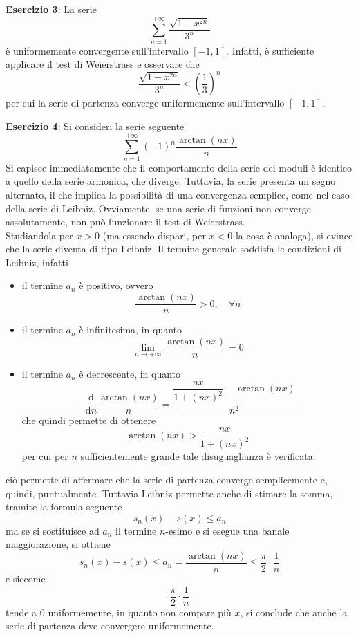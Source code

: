 \documentclass[a4paper]{extarticle}
\newcommand*\dif{\mathop{}\!\mathrm{d}}
\begin{document}
\vspace{1em}
\noindent
\textbf{Esercizio 3}: La serie
\[\sum_{n=1}^{+\infty} \frac{\sqrt{1-x^{2n}}}{3^n}\]
è uniformemente convergente sull'intervallo $[-1,1]$. Infatti, è sufficiente applicare il test di Weierstrass e osservare che
\[\frac{\sqrt{1-x^{2n}}}{3^n} < \left(\frac{1}{3}\right)^n\]
per cui la serie di partenza converge uniformemente sull'intervallo $[-1,1]$.

\vspace{1em}
\noindent
\textbf{Esercizio 4}: Si consideri la serie seguente
\[\sum_{n=1}^{+\infty} (-1)^n \frac{\arctan(nx)}{n}\]
Si capisce immediatamente che il comportamento della serie dei moduli è identico a quello della serie armonica, che diverge. Tuttavia, la serie presenta un segno alternato, il che implica la possibilità di una convergenza semplice, come nel caso della serie di Leibniz. Ovviamente, se una serie di funzioni non converge assolutamente, non può funzionare il test di Weierstrass.\\
Studiandola per $x>0$ (ma essendo dispari, per $x<0$ la cosa è analoga), si evince che la serie diventa di tipo Leibniz. Il termine generale soddisfa le condizioni di Leibniz, infatti
\begin{itemize}
    \item il termine $a_n$ è positivo, ovvero
    \[\frac{\arctan(nx)}{n} > 0, \hspace{1em} \forall n\]
    \item il termine $a_n$ è infinitesima, in quanto
    \[\lim_{{n \to +\infty}} \frac{\arctan(nx)}{n} = 0\]
    \item il termine $a_n$ è decrescente, in quanto
    \[\dfrac{\dif}{\dif n} \frac{\arctan(nx)}{n} = \dfrac{\dfrac{nx}{1+(nx)^2} - \arctan(nx)}{n^2}\]
    che quindi permette di ottenere
    \[\arctan(nx) > \dfrac{nx}{1+(nx)^2}\]
    per cui per $n$ sufficientemente grande tale disuguaglianza è verificata.
\end{itemize}
ciò permette di affermare che la serie di partenza converge semplicemente e, quindi, puntualmente. Tuttavia Leibniz permette anche di stimare la somma, tramite la formula seguente
\[s_n(x)-s(x) \leq a_n\]
ma se si sostituisce ad $a_n$ il termine $n$-esimo e si esegue una banale maggiorazione, si ottiene
\[s_n(x)-s(x) \leq a_n = \frac{\arctan(nx)}{n} \leq \dfrac{\pi}{2} \cdot \dfrac{1}{n}\]
e siccome
\[\dfrac{\pi}{2} \cdot \dfrac{1}{n}\]
tende a $0$ uniformemente, in quanto non compare più $x$, si conclude che anche la serie di partenza deve convergere uniformemente.
\end{document}
